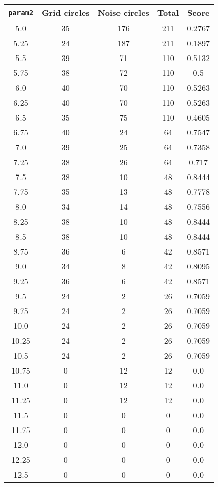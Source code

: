 \documentclass[letterpaper, 12pt]{article}
\begin{document}
\begin{longtable}{|c|c|c|c|c|}
\hline
\textbf{\texttt{param2}} & \textbf{Grid circles} & \textbf{Noise circles} & \textbf{Total} & \textbf{Score} \\
\hline
5.0 & 35 & 176 & 211 & 0.2767 \\
\hline
5.25 & 24 & 187 & 211 & 0.1897 \\
\hline
5.5 & 39 & 71 & 110 & 0.5132 \\
\hline
5.75 & 38 & 72 & 110 & 0.5 \\
\hline
6.0 & 40 & 70 & 110 & 0.5263 \\
\hline
6.25 & 40 & 70 & 110 & 0.5263 \\
\hline
6.5 & 35 & 75 & 110 & 0.4605 \\
\hline
6.75 & 40 & 24 & 64 & 0.7547 \\
\hline
7.0 & 39 & 25 & 64 & 0.7358 \\
\hline
7.25 & 38 & 26 & 64 & 0.717 \\
\hline
7.5 & 38 & 10 & 48 & 0.8444 \\
\hline
7.75 & 35 & 13 & 48 & 0.7778 \\
\hline
8.0 & 34 & 14 & 48 & 0.7556 \\
\hline
8.25 & 38 & 10 & 48 & 0.8444 \\
\hline
8.5 & 38 & 10 & 48 & 0.8444 \\
\hline
8.75 & 36 & 6 & 42 & 0.8571 \\
\hline
9.0 & 34 & 8 & 42 & 0.8095 \\
\hline
9.25 & 36 & 6 & 42 & 0.8571 \\
\hline
9.5 & 24 & 2 & 26 & 0.7059 \\
\hline
9.75 & 24 & 2 & 26 & 0.7059 \\
\hline
10.0 & 24 & 2 & 26 & 0.7059 \\
\hline
10.25 & 24 & 2 & 26 & 0.7059 \\
\hline
10.5 & 24 & 2 & 26 & 0.7059 \\
\hline
10.75 & 0 & 12 & 12 & 0.0 \\
\hline
11.0 & 0 & 12 & 12 & 0.0 \\
\hline
11.25 & 0 & 12 & 12 & 0.0 \\
\hline
11.5 & 0 & 0 & 0 & 0.0 \\
\hline
11.75 & 0 & 0 & 0 & 0.0 \\
\hline
12.0 & 0 & 0 & 0 & 0.0 \\
\hline
12.25 & 0 & 0 & 0 & 0.0 \\
\hline
12.5 & 0 & 0 & 0 & 0.0 \\

\end{longtable}
\end{document}

